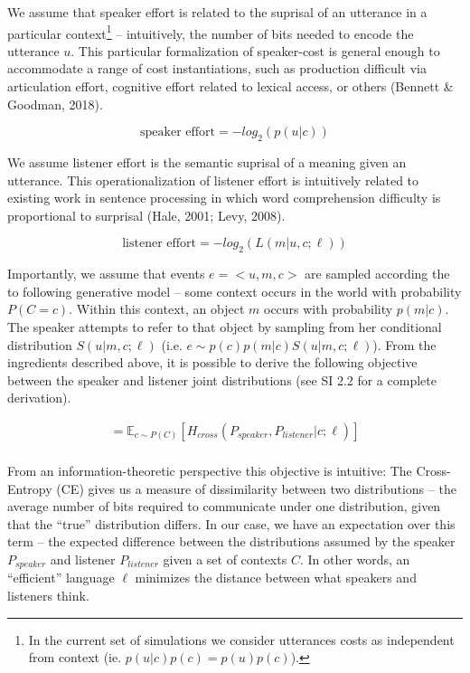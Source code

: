 \documentclass[10pt, letterpaper]{article}
\begin{document}
We assume that speaker effort is related to the suprisal of an utterance
in a particular
context\footnote{In the current set of simulations we consider utterances costs as independent from context (ie. $p(u|c)p(c)=p(u)p(c)$).}
-- intuitively, the number of bits needed to encode the utterance \(u\).
This particular formalization of speaker-cost is general enough to
accommodate a range of cost instantiations, such as production difficult
via articulation effort, cognitive effort related to lexical access, or
others (Bennett \& Goodman, 2018).\par

\[\text{speaker effort} = -log_2(p(u|c))\]

We assume listener effort is the semantic suprisal of a meaning given an
utterance. This operationalization of listener effort is intuitively
related to existing work in sentence processing in which word
comprehension difficulty is proportional to surprisal (Hale, 2001; Levy,
2008).

\[\text{listener effort} = -log_2(L(m|u, c; \ell))\]

Importantly, we assume that events \(e = <u, m, c>\) are sampled
according the to following generative model -- some context occurs in
the world with probability \(P(C=c)\). Within this context, an object
\(m\) occurs with probability \(p(m|c)\). The speaker attempts to refer
to that object by sampling from her conditional distribution
\(S(u|m, c; \ell)\) (i.e. \(e \sim p(c)p(m|c)S(u|m, c; \ell)\)). From
the ingredients described above, it is possible to derive the following
objective between the speaker and listener joint distributions (see SI
2.2 for a complete derivation).

\begin{equation}
\begin{split}
  = \mathbb{E}_{c \sim P(C)}[H_{cross}(P_{speaker}, P_{listener} | c; \ell)]\\
\end{split}
\end{equation}

From an information-theoretic perspective this objective is intuitive:
The Cross-Entropy (CE) gives us a measure of dissimilarity between two
distributions -- the average number of bits required to communicate
under one distribution, given that the ``true'' distribution differs. In
our case, we have an expectation over this term -- the expected
difference between the distributions assumed by the speaker
\(P_{speaker}\) and listener \(P_{listener}\) given a set of contexts
\(C\). In other words, an ``efficient'' language \(\ell\) minimizes the
distance between what speakers and listeners think.
\end{document}

